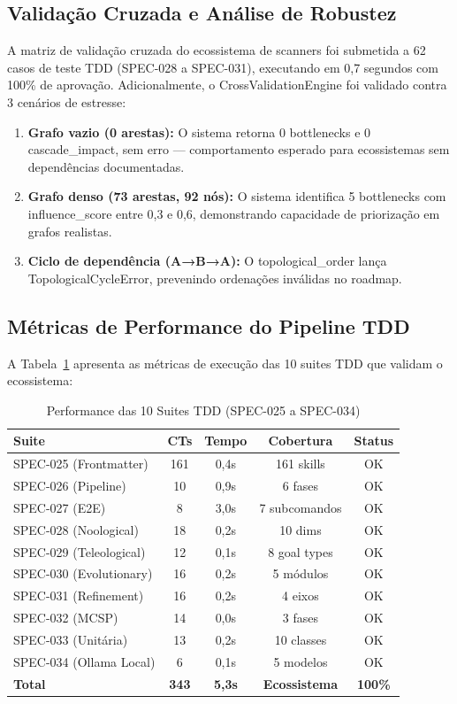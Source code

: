 \subsection{Validação Cruzada e Análise de Robustez}

A matriz de validação cruzada do ecossistema de scanners foi submetida a 62 casos de teste TDD (SPEC-028 a SPEC-031), executando em 0,7 segundos com 100\% de aprovação. Adicionalmente, o CrossValidationEngine foi validado contra 3 cenários de estresse:

\begin{enumerate}
  \item \textbf{Grafo vazio (0 arestas):} O sistema retorna 0 bottlenecks e 0 cascade\_impact, sem erro --- comportamento esperado para ecossistemas sem dependências documentadas.
  \item \textbf{Grafo denso (73 arestas, 92 nós):} O sistema identifica 5 bottlenecks com influence\_score entre 0,3 e 0,6, demonstrando capacidade de priorização em grafos realistas.
  \item \textbf{Ciclo de dependência (A→B→A):} O topological\_order lança TopologicalCycleError, prevenindo ordenações inválidas no roadmap.
\end{enumerate}

\subsection{Métricas de Performance do Pipeline TDD}

A Tabela~\ref{tab:tdd-performance} apresenta as métricas de execução das 10 suites TDD que validam o ecossistema:

\begin{table}[H]
\centering
\caption{Performance das 10 Suites TDD (SPEC-025 a SPEC-034)}
\label{tab:tdd-performance}
\begin{tabular}{p{2.5cm}cccc}
\toprule
\textbf{Suite} & \textbf{CTs} & \textbf{Tempo} & \textbf{Cobertura} & \textbf{Status} \\
\midrule
SPEC-025 (Frontmatter) & 161 & 0,4s & 161 skills & OK \\
SPEC-026 (Pipeline) & 10 & 0,9s & 6 fases & OK \\
SPEC-027 (E2E) & 8 & 3,0s & 7 subcomandos & OK \\
SPEC-028 (Noological) & 18 & 0,2s & 10 dims & OK \\
SPEC-029 (Teleological) & 12 & 0,1s & 8 goal types & OK \\
SPEC-030 (Evolutionary) & 16 & 0,2s & 5 módulos & OK \\
SPEC-031 (Refinement) & 16 & 0,2s & 4 eixos & OK \\
SPEC-032 (MCSP) & 14 & 0,0s & 3 fases & OK \\
SPEC-033 (Unitária) & 13 & 0,2s & 10 classes & OK \\
SPEC-034 (Ollama Local) & 6 & 0,1s & 5 modelos & OK \\
\addlinespace
\textbf{Total} & \textbf{343} & \textbf{5,3s} & \textbf{Ecossistema} & \textbf{100\%} \\
\bottomrule
\end{tabular}
\end{table}

